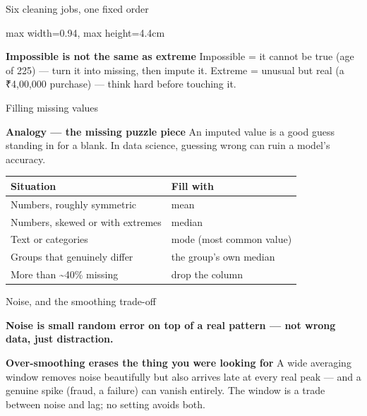 \documentclass[10pt,aspectratio=169]{beamer}
\newcommand{\keyidea}[1]{%
  \begin{block}{}
  \centering\Large\bfseries\color{dsblue} #1
  \end{block}%
}
\newcommand{\trapbox}[2]{%
  \begin{alertblock}{\textbf{#1}}
  #2
  \end{alertblock}%
}
\newcommand{\analogybox}[2]{%
  \begin{exampleblock}{\textbf{Analogy --- #1}}
  #2
  \end{exampleblock}%
}
\begin{document}
\begin{frame}{Six cleaning jobs, one fixed order}
\begin{center}
\begin{adjustbox}{max width=0.94\linewidth, max height=4.4cm}
\end{adjustbox}
\end{center}
\trapbox{Impossible is not the same as extreme}{Impossible = it cannot be true (age of 225) --- turn it into missing, then impute it. Extreme = unusual but real (a ₹4,00,000 purchase) --- think hard before touching it.}
\end{frame}

\begin{frame}{Filling missing values}
\analogybox{the missing puzzle piece}{An imputed value is a good guess standing in for a blank. In data science, guessing wrong can ruin a model's accuracy.}
\begin{table}
\small
\begin{tabularx}{\linewidth}{@{}lX@{}}
\toprule
\textbf{Situation} & \textbf{Fill with} \\
\midrule
Numbers, roughly symmetric & mean \\
Numbers, skewed or with extremes & median \\
Text or categories & mode (most common value) \\
Groups that genuinely differ & the group's own median \\
More than \textasciitilde40\% missing & drop the column \\
\bottomrule
\end{tabularx}
\end{table}
\end{frame}

\begin{frame}{Noise, and the smoothing trade-off}
\keyidea{Noise is small random error on top of a real pattern --- not wrong data, just distraction.}
\vspace{0.3cm}
\trapbox{Over-smoothing erases the thing you were looking for}{A wide averaging window removes noise beautifully but also arrives late at every real peak --- and a genuine spike (fraud, a failure) can vanish entirely. The window is a trade between noise and lag; no setting avoids both.}
\end{frame}
\end{document}
